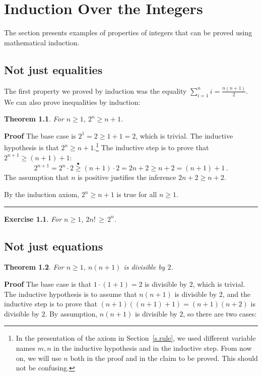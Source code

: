 \documentclass[11pt,a4paper]{report}
\newcommand*{\ihge}{\stackrel{\bullet}{\geq}}
\newcommand*{\qed}{\hfill\rule{1ex}{1.5ex}}
\newtheorem{theorem}{Theorem}
\newtheorem{exercise}{Exercise}
\begin{document}

\chapter{Induction Over the Integers}\label{s.integers}

The section presents examples of properties of integers that can be proved using mathematical induction.

\section{Not just equalities}

The first property we proved by induction was the equality $\sum_{i=1}^n i = \frac{n(n+1)}{2}$. We can also prove inequalities by induction:

\begin{theorem}
For $n\geq 1$, $2^n \geq n+1$.
\end{theorem}

\textbf{Proof} The base case is $2^1=2 \geq 1+1 = 2$, which is trivial. The inductive hypothesis is that $2^n \geq n+1$.\footnote{In the presentation of the axiom in Section~\ref{s.rule}, we used different variable names $m,n$ in the inductive hypothesis and in the inductive step. From now on, we will use $n$ both in the proof and in the claim to be proved. This should not be confusing.} The inductive step is to prove that $2^{n+1} \geq (n+1)+1$:
\[
2^{n+1}= 2^n\cdot 2 \ihge{} (n+1)\cdot 2 = 2n + 2 \geq n+2 = (n+1)+1\,.
\]
The assumption that $n$ is positive justifies the inference $2n+2\geq n+2$.

By the induction axiom, $2^n \geq n+1$ is true for all $n\geq 1$.\qed

\begin{exercise}
For $n\geq 1$, $2n! \,\geq\, 2^n$.
\end{exercise}

\section{Not just equations}

\begin{theorem}\label{t.div2}
For $n\geq 1$, $n(n+1)$ is divisible by $2$.
\end{theorem}

\textbf{Proof} The base case is that $1\cdot (1+1) = 2$ is divisible by $2$, which is trivial. The inductive hypothesis is to assume that $n(n+1)$ is divisible by $2$, and the inductive step is to prove that $(n+1)((n+1)+1)=(n+1)(n+2)$ is divisible by $2$. By assumption, $n(n+1)$ is divisible by $2$, so there are two cases:
\end{document}

